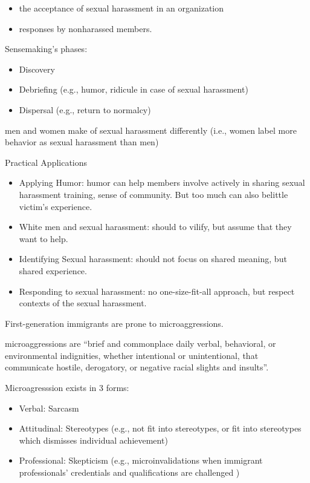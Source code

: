 \documentclass[
]{book}
\providecommand{\tightlist}{%
  \setlength{\itemsep}{0pt}\setlength{\parskip}{0pt}}
\begin{document}
\begin{itemize}
\tightlist
\item
  the acceptance of sexual harassment in an organization
\item
  responses by nonharassed members.
\end{itemize}

Sensemaking's phases:

\begin{itemize}
\tightlist
\item
  Discovery
\item
  Debriefing (e.g., humor, ridicule in case of sexual harassment)
\item
  Dispersal (e.g., return to normalcy)
\end{itemize}

men and women make of sexual harassment differently (i.e., women label more behavior as sexual harassment than men)

Practical Applications

\begin{itemize}
\tightlist
\item
  Applying Humor: humor can help members involve actively in sharing sexual harassment training, sense of community.
  But too much can also belittle victim's experience.
\item
  White men and sexual harassment: should to vilify, but assume that they want to help.
\item
  Identifying Sexual harassment: should not focus on shared meaning, but shared experience.
\item
  Responding to sexual harassment: no one-size-fit-all approach, but respect contexts of the sexual harassment.
\end{itemize}

\citep{Shenoy_Packer_2014}

First-generation immigrants are prone to microaggressions.

microaggressions are ``brief and commonplace daily verbal, behavioral, or environmental indignities, whether intentional
or unintentional, that communicate hostile, derogatory, or negative racial slights and insults''. \citep{Sue_2007}

Microagresssion exists in 3 forms:

\begin{itemize}
\tightlist
\item
  Verbal: Sarcasm
\item
  Attitudinal: Stereotypes (e.g., not fit into stereotypes, or fit into stereotypes which dismisses individual
  achievement)\\
\item
  Professional: Skepticism (e.g., microinvalidations when immigrant professionals' credentials and qualifications are
  challenged )
\end{itemize}
\end{document}
